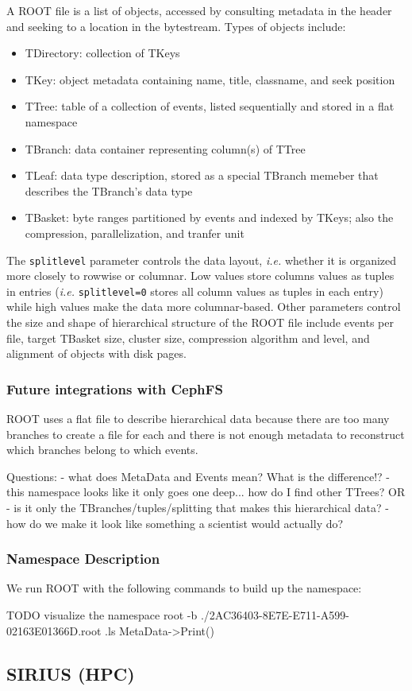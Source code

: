 A ROOT file is a list of objects, accessed by consulting metadata in the
header and seeking to a location in the bytestream. Types of objects include: 

\begin{itemize}

  \item TDirectory: collection of TKeys

  \item TKey: object metadata containing name, title, classname, and seek
  position

  \item TTree: table of a collection of events, listed sequentially and stored in a flat namespace

  \item TBranch: data container representing column(s) of TTree

  \item TLeaf: data type description, stored as a special TBranch memeber
  that describes the TBranch's data type

  \item TBasket: byte ranges partitioned by events and indexed by TKeys;
  also the compression, parallelization, and tranfer unit

\end{itemize}

The \texttt{splitlevel} parameter controls the data layout, {\it i.e.}
whether it is organized more closely to rowwise or columnar. Low values
store columns values as tuples in entries ({\it i.e.} \texttt{splitlevel=0}
stores all column values as tuples in each entry) while high values make
the data more columnar-based. Other parameters control the size and shape
of hierarchical structure of the ROOT file include events per file, target
TBasket size, cluster size, compression algorithm and level, and alignment
of objects with disk pages.

\subsubsection{Future integrations with CephFS}

ROOT uses a flat file to describe hierarchical data because there are too many
branches to create a file for each and there is not enough metadata to
reconstruct which branches belong to which events.

Questions: 
- what does MetaData and Events mean? What is the difference!?
- this namespace looks like it only goes one deep... how do I find other TTrees? OR
- is it only the TBranches/tuples/splitting that makes this hierarchical data? 
  - how do we make it look like something a scientist would actually do?

\subsubsection{Namespace Description}

We run ROOT with the following commands to build up the namespace:

TODO visualize the namespace
root -b ./2AC36403-8E7E-E711-A599-02163E01366D.root
.ls
MetaData->Print()

\subsection{SIRIUS (HPC)}
